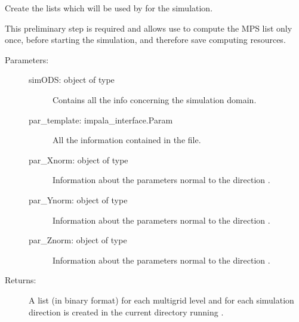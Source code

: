 \documentclass[letterpaper,10pt,english]{sphinxmanual}
\begin{document}

\begin{fulllineitems}
\label{\detokenize{appendices:s2Dcd.s2Dcd.create_lists}}
Create the lists which will be used by  for the simulation.

This preliminary step is required and allows use  to
compute the MPS list only once, before starting the simulation,
and therefore save computing resources.
\begin{description}
\item[{Parameters:}] \leavevmode\begin{description}
\item[{simODS: object of type }] \leavevmode
Contains all the info concerning the simulation domain.

\item[{par\_template: impala\_interface.Param}] \leavevmode
All the information contained in the  file.

\item[{par\_Xnorm: object of type }] \leavevmode
Information about the  parameters normal to the
direction .

\item[{par\_Ynorm: object of type }] \leavevmode
Information about the  parameters normal to the
direction .

\item[{par\_Znorm: object of type }] \leavevmode
Information about the  parameters normal to the
direction .

\end{description}

\item[{Returns: }] \leavevmode
A list (in binary format) for each multi\sphinxhyphen{}grid level and for
each simulation direction is created in the current directory
running .

\end{description}

\end{fulllineitems}
\end{document}
